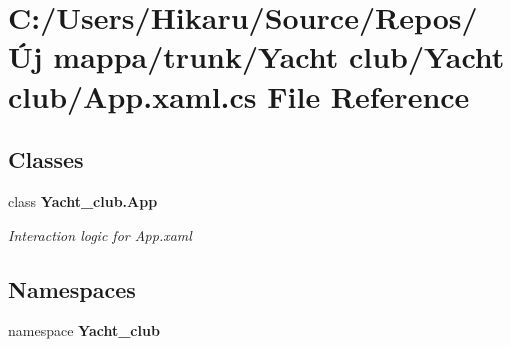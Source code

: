 \section{C\+:/\+Users/\+Hikaru/\+Source/\+Repos/Új mappa/trunk/\+Yacht club/\+Yacht club/\+App.xaml.\+cs File Reference}
\label{_app_8xaml_8cs}
\subsection*{Classes}
\begin{DoxyCompactItemize}
\item 
class \textbf{ Yacht\+\_\+club.\+App}
\begin{DoxyCompactList}\small\item\em Interaction logic for App.\+xaml \end{DoxyCompactList}\end{DoxyCompactItemize}
\subsection*{Namespaces}
\begin{DoxyCompactItemize}
\item 
namespace \textbf{ Yacht\+\_\+club}
\end{DoxyCompactItemize}
